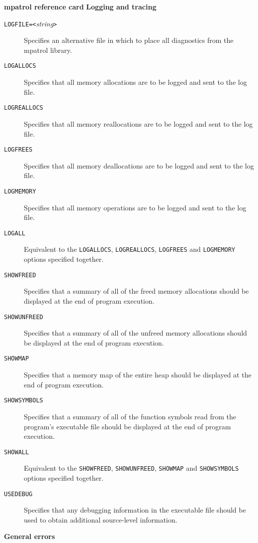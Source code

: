 \documentclass[a4paper,landscape,final]{article}
\newcommand{\heading}[1]{\textbf{\normalsize #1}}
\newcommand{\option}[1]{\texttt{#1}}
\newcommand{\optionpar}[2]{\option{#1}\texttt{=<}\textit{#2}\texttt{>}}
\begin{document}
\begin{multicols}{3}{\textbf{\Large mpatrol reference card}}
\vskip 12pt
\heading{Logging and tracing}
\vskip 6pt

\begin{description}
\item[\optionpar{LOGFILE}{string}]
Specifies an alternative file in which to place all diagnostics from the mpatrol
library.
\item[\option{LOGALLOCS}]
Specifies that all memory allocations are to be logged and sent to the log file.
\item[\option{LOGREALLOCS}]
Specifies that all memory reallocations are to be logged and sent to the log
file.
\item[\option{LOGFREES}]
Specifies that all memory deallocations are to be logged and sent to the log
file.
\item[\option{LOGMEMORY}]
Specifies that all memory operations are to be logged and sent to the log file.
\item[\option{LOGALL}]
Equivalent to the \option{LOGALLOCS}, \option{LOGREALLOCS}, \option{LOGFREES}
and \option{LOGMEMORY} options specified together.
\item[\option{SHOWFREED}]
Specifies that a summary of all of the freed memory allocations should be
displayed at the end of program execution.
\item[\option{SHOWUNFREED}]
Specifies that a summary of all of the unfreed memory allocations should be
displayed at the end of program execution.
\item[\option{SHOWMAP}]
Specifies that a memory map of the entire heap should be displayed at the end of
program execution.
\item[\option{SHOWSYMBOLS}]
Specifies that a summary of all of the function symbols read from the program's
executable file should be displayed at the end of program execution.
\item[\option{SHOWALL}]
Equivalent to the \option{SHOWFREED}, \option{SHOWUNFREED}, \option{SHOWMAP} and
\option{SHOWSYMBOLS} options specified together.
\item[\option{USEDEBUG}]
Specifies that any debugging information in the executable file should be used
to obtain additional source-level information.
\end{description}

\vskip 12pt
\heading{General errors}
\vskip 6pt


\end{multicols}
\end{document}
